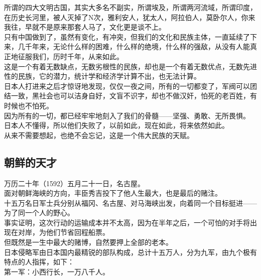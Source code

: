 \begin{multicols}{\theparacolNo}
所谓的四大文明古国，其实大多名不副实，所谓埃及，所谓两河流域，所谓印度，在历史长河里，被人灭掉了N次，雅利安人，犹太人，阿拉伯人，莫卧尔人，你来我往，早就不是原来那套人马了，文化更是谈不上。\\

只有中国做到了，虽然有变化，有冲突，但我们的文化和民族主体，一直延续了下来，几千年来，无论什么样的困难，什么样的绝境，什么样的强敌，从没有人能真正地征服我们，历时千年，从来如此。\\

这是一个有着无数缺点，无数劣根性的民族，却也是一个有着无数优点，无数先进性的民族，它的潜力，统计学和经济学计算不出，也无法计算。\\

日本人打进来之后才惊讶地发现，仅仅一夜之间，所有的一切都变了，军阀可以团结一致，黑社会也可以洁身自好，文盲不识字，却也不做汉奸，怕死的老百姓，有时候也不怕死。\\

因为所有的一切，都已经牢牢地刻入了我们的骨髓——坚强、勇敢、无所畏惧。\\

日本人不懂得，所以他们失败了，以前如此，现在如此，将来依然如此。\\

从来不需要想起，也绝不会忘记，这是一个伟大民族的天赋。\\

\subsection{朝鲜的天才}
万历二十年（1592）五月二十一日，名古屋。\\

面对朝鲜海峡的方向，丰臣秀吉投下了他人生最大，也是最后的赌注。\\

十五万名日军士兵分别从福冈、名古屋、对马海峡出发，向着同一个目标挺进——为了同一个人的野心。\\

事实证明，这次行动的运输成本并不太高，因为在半年之后，一个可怕的对手将出现在对岸，为他们节省回程船票。\\

但既然是一生中最大的赌博，自然要押上全部的老本。\\

日本侵略军由日本国内最精锐的部队构成，总计十五万人，分为九军，由九个极有特点的人指挥，如下：\\

第一军：小西行长，一万八千人。\\


\end{multicols}
